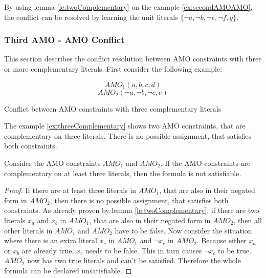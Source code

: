By using lemma \ref{le:twoComplementary} on the example \ref{ex:secondAMOAMO}, the conflict can be resolved by learning the unit literals $\{\neg a, \neg b, \neg e, \neg f, g\}$.

\newpage
\subsubsection{Third AMO - AMO Conflict}

This section describes the conflict resolution between AMO constraints with three or more complementary literals. First consider the following example:

\begin{example}
\begin{leftbar}
\begin{displaymath}
AMO_1(a,b,c,d)
\end{displaymath}
\begin{displaymath}
AMO_2(\neg a, \neg b, \neg c, e)
\end{displaymath}
\end{leftbar}
\caption{Conflict between AMO constraints with three complementary literals}
\label{ex:threeComplementary}
\end{example}

The example \ref{ex:threeComplementary} shows two AMO constraints, that are complementary on three literals. There is no possible assignment, that satisfies both constraints.

\begin{lemma}
\begin{leftbar}
Consider the AMO constraints $AMO_1$ and $AMO_2$. If the AMO constraints are complementary on at least three literals, then the formula is not satisfiable.
\end{leftbar}
\end{lemma}

\begin{proof}
If there are at least three literals in $AMO_1$, that are also in their negated form in $AMO_2$, then there is no possible assignment, that satisfies both constraints. As already proven by lemma \ref{le:twoComplementary}, if there are two literals $x_a$ and $x_b$ in $AMO_1$, that are also in their negated form in $AMO_2$, then all other literals in $AMO_1$ and $AMO_2$ have to be false. Now consider the situation where there is an extra literal $x_c$ in $AMO_1$ and $\neg x_c$ in $AMO_2$. Because either $x_a$ or $x_b$ are already true, $x_c$ needs to be false. This in turn causes $\neg x_c$ to be true. $AMO_2$ now has two true literals and can't be satisfied. Therefore the whole formula can be declared unsatisfiable.
\end{proof}

